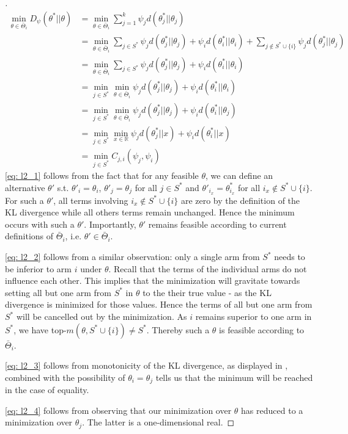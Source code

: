 \begin{proof}[]
  \begin{align}
    \min_{\theta \in \bar{\Theta}_i} D_\psi(\theta^*||\theta) &= \min_{\theta \in \bar{\Theta}_i} \sum_{j=1}^k \psi_j d(\theta^*_j||\theta_j)\\
    &= \min_{\theta \in \bar{\Theta}_i} \sum_{j\in S^*} \psi_{j}d(\theta^*_{j} || \theta_{j}) + \psi_{i}d(\theta_{i}^* || \theta_{i}) + \sum_{j \notin S^* \cup \{i\}} \psi_j d(\theta^*_j||\theta_j) \\
    &= \min_{\theta \in \bar{\Theta}_i} \sum_{j\in S^*} \psi_{j}d(\theta^*_{j} || \theta_{j}) + \psi_{i}d(\theta_{i}^* || \theta_{i}) \label{eq: l2_1}\\
    &= \min_{j\in S^*} \min_{\theta \in \bar{\Theta}_i} \psi_{j}d(\theta^*_{j} || \theta_{j}) + \psi_{i}d(\theta_{i}^* || \theta_{i}) \label{eq: l2_2}\\
    &= \min_{j\in S^*} \min_{\theta \in \bar{\Theta}_i} \psi_{j}d(\theta^*_{j} || \theta_{j}) + \psi_{i}d(\theta_{i}^* || \theta_{j}) \label{eq: l2_3}\\
    &= \min_{j\in S^*} \min_{x \in \mathbb{R}} \psi_{j}d(\theta^*_{j} || x) + \psi_{i}d(\theta_{i}^* ||x) \label{eq: l2_4}\\
    &= \min_{j \in S^*} C_{j, i}(\psi_j, \psi_i)
  \end{align}
  \eqref{eq: l2_1} follows from the fact that for any feasible $\theta$, we can define an alternative $\theta'$ s.t. $\theta'_i = \theta_i$, $\theta'_j = \theta_j$ for all $j \in S^*$ and $\theta'_{i_x} = \theta^*_{i_x}$ for all $i_x \notin S^* \cup \{i\}$. For such a $\theta'$, all terms involving $i_x \notin S^* \cup \{i\}$ are zero by the definition of the KL divergence while all others terms remain unchanged. Hence the minimum occurs with such a $\theta'$. Importantly, $\theta'$ remains feasible according to current definitions of $\bar{\Theta}_i$, i.e. $\theta' \in \bar{\Theta}_i$.

  \eqref{eq: l2_2} follows from a similar observation: only a single arm from $S^*$ needs to be inferior to arm $i$ under $\theta$. Recall that the terms of the individual arms do not influence each other. This implies that the minimization will gravitate towards setting all but one arm from $S^*$ in $\theta$ to the their true value - as the KL divergence is minimized for those values. Hence the terms of all but one arm from $S^*$ will be cancelled out by the minimization. As $i$ remains superior to one arm in $S^*$, we have top-$m(\theta, S^* \cup \{i\}) \neq S^*$. Thereby such a $\theta$ is feasible according to $\bar{\Theta}_i$.

  \eqref{eq: l2_3} follows from monotonicity of the KL divergence, as displayed in , combined with the possibility of $\theta_i = \theta_j$ tells us that the minimum will be reached in the case of equality.

  \eqref{eq: l2_4} follows from observing that our minimization over $\theta$ has reduced to a minimization over $\theta_j$. The latter is a one-dimensional real.
\end{proof}

